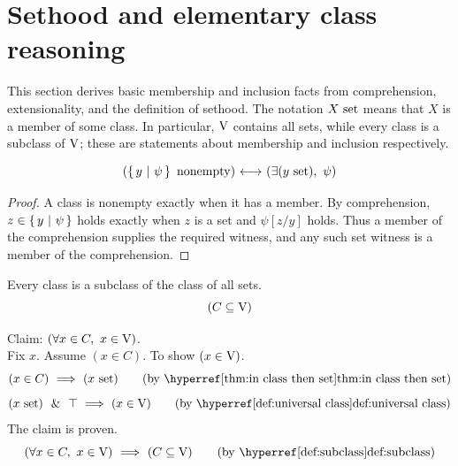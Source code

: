 \def\topic{}

\section{Sethood and elementary class reasoning}
This section derives basic membership and inclusion facts from
comprehension, extensionality, and the definition of sethood. The notation
$X\mathrm{\ set}$ means that $X$ is a member of some class. In particular, $\mathrm{V}$
contains all sets, while every class is a subclass of $\mathrm{V}$; these are
statements about membership and inclusion respectively.

\iftrue
\begin{theorem}
\[
(\left\{\,y\ \middle|\ \psi\,\right\}\mathrm{\ nonempty})
{\ \longleftrightarrow\ }
(\exists (y\mathrm{\ set}),\ \psi)
\]
\end{theorem}
\begin{proof}
A class is nonempty exactly when it has a member. By comprehension,
$z\in\left\{\,y\ \middle|\ \psi\,\right\}$ holds exactly when $z$ is a set and $\psi[z/y]$ holds.
Thus a member of the comprehension supplies the required witness, and any
such set witness is a member of the comprehension.
\end{proof}
\fi

\begin{theorem}[V is maximal]
Every class is a subclass of the class of all sets.
\[
(C\subseteq \mathrm{V})
\]
\end{theorem}
\Proof
Claim: $(\forall x\in C,\ x\in \mathrm{V})$.\\
Fix $x$. Assume $(x\in C)$. To show $(x\in \mathrm{V})$.
\[
(x\in C)
\IMPLIES
(x\set)
\tag{by \myref{thm:in class then set}}
\]
\[
(x\set)
\LAND
\top
\IMPLIES
(x\in \V)
\tag{by \myref{def:universal class}}
\]
The claim is proven.
\[
(\forall x\in C,\ x\in \V)
\IMPLIES
(C\subseteq \V)
\tag{by \myref{def:subclass}}
\]
\Done

